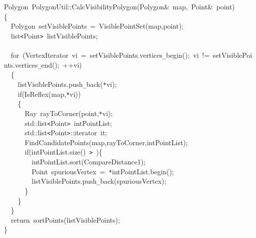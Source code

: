{
\noindent \ttfamily
\jttstylek Polygon~PolygonUtil::CalcVisibilityPolygon\jttstylei (\jttstylek Polygon\&~map,~Point\&~point\jttstylei )\\
\jttstylei \{\\
\jttstylea ~~\jttstylek Polygon~setVisiblePoints~=~VisiblePointSet\jttstylei (\jttstylek map,point\jttstylei )\jttstylek ;\\
\jttstylea ~~\jttstylek list\verb#<#Point\verb#>#~listVisiblePoints;\\
\jttstylea \\
\jttstylea ~~\jttstylee for~\jttstylei (\jttstylek VertexIterator~vi~=~setVisiblePoints.vertices\verb#_#begin\jttstylei ()\jttstylek ;~vi~!=~setVisiblePoints.vertices\verb#_#end\jttstylei ()\jttstylek ;~++vi\jttstylei )\\
\jttstylea ~~\jttstylei \{\\
\jttstylea ~~~~\jttstylek listVisiblePoints.push\verb#_#back\jttstylei (\jttstylek \verb#*#vi\jttstylei )\jttstylek ;\\
\jttstylea ~~~~\jttstylee if\jttstylei (\jttstylek IsReflex\jttstylei (\jttstylek map,\verb#*#vi\jttstylei ))\\
\jttstylea ~~~~\jttstylei \{\\
\jttstylea ~~~~~~\jttstylek Ray~rayToCorner\jttstylei (\jttstylek point,\verb#*#vi\jttstylei )\jttstylek ;\\
\jttstylea ~~~~~~\jttstylek std::list\verb#<#Point\verb#>#~intPointList;\\
\jttstylea ~~~~~~\jttstylek std::list\verb#<#Point\verb#>#::iterator~it;\\
\jttstylea ~~~~~~\jttstylek FindCandidatePoints\jttstylei (\jttstylek map,rayToCorner,intPointList\jttstylei )\jttstylek ;\\
\jttstylea ~~~~~~\jttstylee if\jttstylei (\jttstylek intPointList.size\jttstylei ()~\jttstylek \verb#>#~\jttstylei )\{\\
\jttstylea ~~~~~~~~\jttstylek intPointList.sort\jttstylei (\jttstylek CompareDistance1\jttstylei )\jttstylek ;\\
\jttstylea ~~~~~~~~\jttstylek Point~spuriousVertex~=~\verb#*#intPointList.begin\jttstylei ()\jttstylek ;\\
\jttstylea ~~~~~~~~\jttstylek listVisiblePoints.push\verb#_#back\jttstylei (\jttstylek spuriousVertex\jttstylei )\jttstylek ;\\
\jttstylea ~~~~~~\jttstylei \}\\
\jttstylea ~~~~\jttstylei \}\\
\jttstylea ~~\jttstylei \}\\
\jttstylea ~~\jttstylee return~\jttstylek sortPoints\jttstylei (\jttstylek listVisiblePoints\jttstylei )\jttstylek ;\\
\jttstylei \}\\

}

